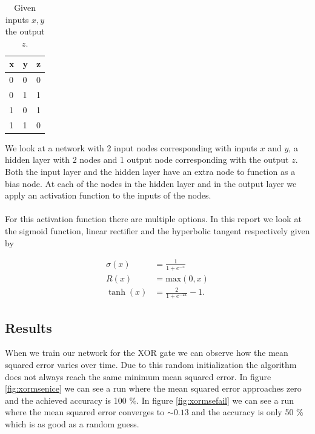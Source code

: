 \documentclass[10 pt, a4paper]{article}
\begin{document}
\begin{table}[H]
\centering
\begin{tabular}{ll|l}
x & y & z \\ \hline
0 & 0 & 0 \\
0 & 1 & 1 \\
1 & 0 & 1 \\
1 & 1 & 0
\end{tabular}
\caption{Given inputs $x,y$ the output $z$.}
\end{table}

We look at a network with 2 input nodes corresponding with inputs $x$ and $y$, a hidden layer with 2 nodes and 1 output node corresponding with the output $z$. Both the input layer and the hidden layer have an extra node to function as a bias node. At each of the nodes in the hidden layer and in the output layer we apply an activation function to the inputs of the nodes.
\\
\\
For this activation function there are multiple options. In this report we look at the sigmoid function, linear rectifier and the hyperbolic tangent respectively given by

\begin{align}
\sigma (x) &= \frac{1}{1 + e^{-x}} \\
R (x) &= \mathrm{max}(0,x) \\
\tanh (x) &= \frac{2}{1 + e^{-2x}} - 1.
\end{align}

\subsection{Results}

When we train our network for the XOR gate we can observe how the mean squared error varies over time. Due to this random initialization the algorithm does not always reach the same minimum mean squared error. In figure \ref{fig:xormsenice} we can see a run where the mean squared error approaches zero and the achieved accuracy is 100 \%. In figure \ref{fig:xormsefail} we can see a run where the mean squared error converges to $\sim 0.13$ and the accuracy is only 50 \% which is as good as a random guess. 
\end{document}
